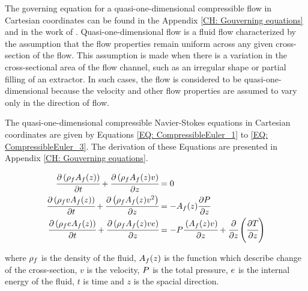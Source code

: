 \documentclass[../Article_Model_Parameters.tex]{subfiles}
\begin{document}
	
	The governing equation for a quasi-one-dimensional compressible flow in Cartesian coordinates can be found in the Appendix \ref{CH: Gouverning equations} and in the work of \citet{Anderson1995}. Quasi-one-dimensional flow is a fluid flow characterized by the assumption that the flow properties remain uniform across any given cross-section of the flow. This assumption is made when there is a variation in the cross-sectional area of the flow channel, such as an irregular shape or partial filling of an extractor. In such cases, the flow is considered to be quasi-one-dimensional because the velocity and other flow properties are assumed to vary only in the direction of flow.
	
	The quasi-one-dimensional compressible Navier-Stokes equations in Cartesian coordinates are given by Equations \ref{EQ: CompressibleEuler_1} to \ref{EQ: CompressibleEuler_3}. The derivation of these Equations are presented in Appendix \ref{CH: Gouverning equations}.
	
	{\footnotesize
		\begin{align}
			\label{EQ: CompressibleEuler_1}
			\cfrac{\partial \left( {\color{black}\rho_f} {\color{black}A_f}(z) \right) }{\partial t} + \cfrac{\partial \left( {\color{black}\rho_f} {\color{black}A_f}(z) v \right)}{\partial z} &= 0 \\
			\cfrac{\partial \left( {\color{black}\rho_f} v {\color{black}A_f}(z) \right) }{\partial t} + \cfrac{\partial \left( {\color{black}\rho_f} {\color{black}A_f}(z) v^2 \right)}{\partial z} &= -{\color{black}A_f}(z) \cfrac{\partial {\color{black}P}}{\partial z} \label{EQ: CompressibleEuler_2} \\
			\cfrac{\partial \left( {\color{black}\rho_f} {\color{black}e} {\color{black}A_f}(z) \right) }{\partial t} + \cfrac{\partial \left( {\color{black}\rho_f} {\color{black}A_f}(z) v {\color{black}e}\right)}{\partial z} &= -{\color{black}P}\cfrac{\left( {\color{black}A_f}(z) v \right)}{\partial z} + \cfrac{\partial}{\partial z} \left( \cfrac{\partial {\color{black}T}}{\partial z} \right)   
			\label{EQ: CompressibleEuler_3}
		\end{align}  
	}
	
	where ${\color{black}\rho_f}$ is the density of the fluid, ${\color{black}A_f}(z)$ is the function which describe change of the cross-section, $v$ is the velocity, ${\color{black}P}$ is the total pressure, ${\color{black}e}$ is the internal energy of the fluid, $t$ is time and $z$ is the spacial direction.
	
\end{document}
